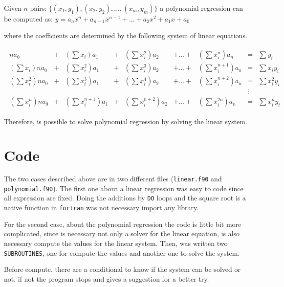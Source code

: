 Given $n$ pairs: $\{ (x_1, y_1), (x_2, y_2), ..., (x_m, y_m)\}$ a polynomial regression can be computed as:
$y = a_nx^n + a_{n-1}x^{n-1} + ... + a_2 x^2 + a_1x + a_0$

\noindent where the coefficients are determined by the following system of linear equations.

\begin{align}
\begin{matrix}
na_0             & + & (\sum x_i)a_1       & + & (\sum x_i^2)a_2     & +...+ & (\sum x_i^n)a_n     & = & \sum y_i       \\
(\sum x_i)na_0   & + & (\sum x_i^2)a_1     & + & (\sum x_i^3)a_2     & +...+ & (\sum x_i^{n+1})a_n & = & \sum x_i y_i   \\
(\sum x_i^2)na_0 & + & (\sum x_i^3)a_1     & + & (\sum x_i^4)a_2     & +...+ & (\sum x_i^{n+2})a_n & = & \sum x_i^2 y_i \\
                 &   &                     &   &                     &       &                     & \vdots &           \\
(\sum x_i^n)na_0 & + & (\sum x_i^{n+1})a_1 & + & (\sum x_i^{n+2})a_2 & +...+ & (\sum x_i^{2n})a_n  & = & \sum x_i^n y_i
\end{matrix}
\end{align}

Therefore, is possible to solve polynomial regression by solving the linear system.

\section{\textbf{Code}}

The two cases described above are in two different files (\texttt{linear.f90}
and \texttt{polynomial.f90}). The first one about a linear regression was easy
to code since all expression are fixed. Doing the additions by \texttt{DO}
loops and the square root is a native function in \texttt{fortran} was not
necessary import any library.

For the second case, about the polynomial regression the code is little bit
more complicated, since is necessary not only a solver for the linear equation,
is also necessary compute the values for the linear system. Then, was written
two \texttt{SUBROUTINES}, one for compute the values and another one to solve
the system.

Before compute, there are a conditional to know if the system can be solved or not,
if not the program stops and gives a suggestion for a better try.

